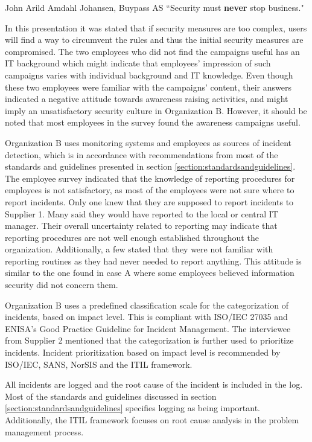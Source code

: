 \begin{newquote}{John Arild Amdahl Johansen, Buypass AS}
``Security must \textbf{never} stop business."
\end{newquote}

In this presentation it was stated that if security measures are too complex, users will find a way to circumvent the rules and thus the initial security measures are compromised. The two employees who did not find the campaigns useful has an IT background which might indicate that employees' impression of such campaigns varies with individual background and IT knowledge. Even though these two employees were familiar with the campaigns' content, their answers indicated a negative attitude towards awareness raising activities, and might imply an unsatisfactory security culture in Organization B. However, it should be noted that most employees in the survey found the awareness campaigns useful.

Organization B uses monitoring systems and employees as sources of incident detection, which is in accordance with recommendations from most of the standards and guidelines presented in section \ref{section:standardsandguidelines}. The employee survey indicated that the knowledge of reporting procedures for employees is not satisfactory, as most of the employees were not sure where to report incidents. Only one knew that they are supposed to report incidents to Supplier 1. Many said they would have reported to the local or central IT manager. Their overall uncertainty related to reporting may indicate that reporting procedures are not well enough established throughout the organization. Additionally, a few stated that they were not familiar with reporting routines as they had never needed to report anything. This attitude is similar to the one found in case A where some employees believed information security did not concern them. 

Organization B uses a predefined classification scale for the categorization of incidents, based on impact level. This is compliant with ISO/IEC 27035 and ENISA's Good Practice Guideline for Incident Management. The interviewee from Supplier 2 mentioned that the categorization is further used to prioritize incidents. Incident prioritization based on impact level is recommended by ISO/IEC, SANS, NorSIS and the ITIL framework.

All incidents are logged and the root cause of the incident is included in the log. Most of the standards and guidelines discussed in section \ref{section:standardsandguidelines} specifies logging as being important. Additionally, the ITIL framework focuses on root cause analysis in the problem management process.

